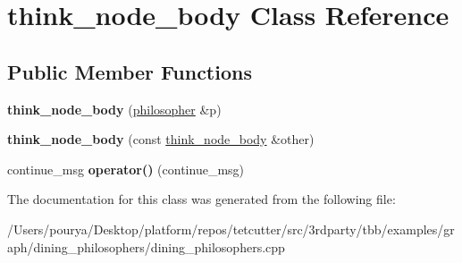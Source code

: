 \hypertarget{classthink__node__body}{}\section{think\+\_\+node\+\_\+body Class Reference}
\label{classthink__node__body}
\subsection*{Public Member Functions}
\begin{DoxyCompactItemize}
\item 
\hypertarget{classthink__node__body_af71c48649e07612c032ebaf17bfb399c}{}{\bfseries think\+\_\+node\+\_\+body} (\hyperlink{classphilosopher}{philosopher} \&p)\label{classthink__node__body_af71c48649e07612c032ebaf17bfb399c}

\item 
\hypertarget{classthink__node__body_a7b9712be14a063fee68a4e96e33fa349}{}{\bfseries think\+\_\+node\+\_\+body} (const \hyperlink{classthink__node__body}{think\+\_\+node\+\_\+body} \&other)\label{classthink__node__body_a7b9712be14a063fee68a4e96e33fa349}

\item 
\hypertarget{classthink__node__body_a7ced0eed7bdd4bcc5a953376dac17c6a}{}continue\+\_\+msg {\bfseries operator()} (continue\+\_\+msg)\label{classthink__node__body_a7ced0eed7bdd4bcc5a953376dac17c6a}

\end{DoxyCompactItemize}


The documentation for this class was generated from the following file\+:\begin{DoxyCompactItemize}
\item 
/\+Users/pourya/\+Desktop/platform/repos/tetcutter/src/3rdparty/tbb/examples/graph/dining\+\_\+philosophers/dining\+\_\+philosophers.\+cpp\end{DoxyCompactItemize}
